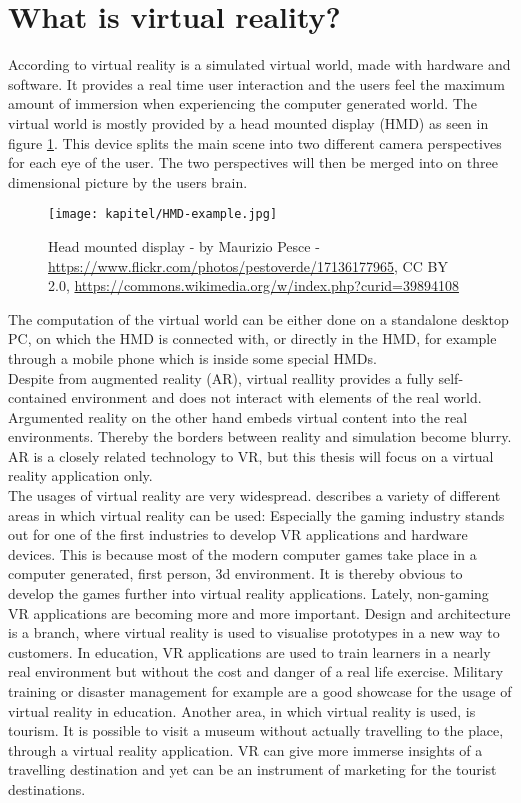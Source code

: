\section{What is virtual reality?}
According to \cite{Fuchs.2011} virtual reality is a simulated virtual world, made with hardware and software. It provides a real time user interaction and the users feel the maximum amount of immersion when experiencing the computer generated world. The virtual world is mostly provided by a head mounted display (HMD) as seen in figure \ref{fig:hmd}. This device splits the main scene into two different camera perspectives for each eye of the user. The two perspectives will then be merged into on three dimensional picture by the users brain. \\
\begin{figure}[h!]
  \texttt{[image: kapitel/HMD-example.jpg]}
  \centering
  \caption{Head mounted display - by Maurizio Pesce -  \url{https://www.flickr.com/photos/pestoverde/17136177965}, CC BY 2.0, \url{https://commons.wikimedia.org/w/index.php?curid=39894108}
}
  \label{fig:hmd}
\end{figure}
The computation of the virtual world can be either done on a standalone desktop PC, on which the HMD is connected with, or directly in the HMD, for example through a mobile phone which is inside some special HMDs.\\
Despite from augmented reality (AR), virtual reallity provides a fully self-contained environment and does not interact with elements of the real world. Argumented reality on the other hand embeds virtual content into the real environments. Thereby the borders between reality and simulation become blurry. AR is a closely related technology to VR, but this thesis will focus on a virtual reality application only.\\
The usages of virtual reality are very widespread. \cite{Linowes.2015} describes a variety of different areas in which virtual reality can be used: Especially the gaming industry stands out for one of the first industries to develop VR applications and hardware devices. This is because most of the modern computer games take place in a computer generated, first person, 3d environment. It is thereby obvious to develop the games further into virtual reality applications. Lately, non-gaming VR applications are becoming more and more important. Design and architecture is a branch, where virtual reality is used to visualise prototypes in a new way to customers. In education, VR applications are used to train learners  in a nearly real environment but without the cost and danger of a real life exercise. Military training or disaster management for example are a good showcase for the usage of virtual reality in education. Another area, in which virtual reality is used, is tourism. It is possible to visit a museum without actually travelling to the place, through a virtual reality application. VR can give more immerse insights of a travelling destination and yet can be an instrument of marketing for the tourist destinations.

